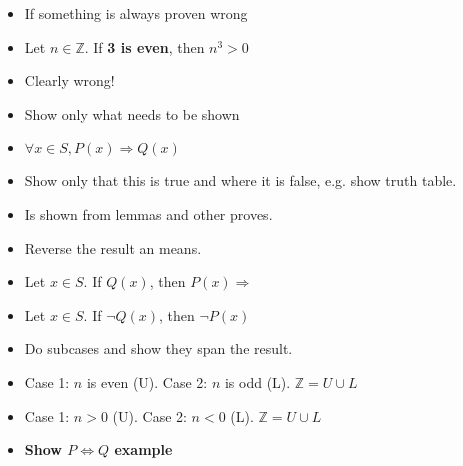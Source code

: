 \documentclass[english,10pt,a4paper]{article}
\begin{document}
\begin{theo} 
\begin{itemize}
\item If something is always proven wrong
\item Let $n \in \mathbb{Z}$. If \textbf{3 is even}, then $n^3 > 0$
\item[] Clearly wrong!
\end{itemize}
\end{theo}



\begin{theo} 
\begin{itemize}
\item Show only what needs to be shown
\item $\forall x \in S, P(x) \Rightarrow Q(x)$
\item[] Show only that this is true and where it is false, e.g. show truth table.
\item Is shown from lemmas and other proves.
\end{itemize}
\end{theo}



\begin{theo} 
\begin{itemize}
\item Reverse the result an means.
\item Let $x \in S$. If $Q(x)$, then $P(x) \Rightarrow$
\item[] Let $x \in S$. If $\neg Q(x)$, then $\neg P(x)$
\end{itemize}
\end{theo}



\begin{theo} 
\begin{itemize}
\item Do subcases and show they span the result.
\item Case 1: $n$ is even (U). Case 2: $n$ is odd (L). $\mathbb{Z} = U \cup L $
\item Case 1: $n>0$ (U). Case 2: $n<0$ (L). $\mathbb{Z} = U \cup L$
\item \textbf{Show $P \Leftrightarrow Q$ example}
\end{itemize}
\end{theo}
\end{document}
